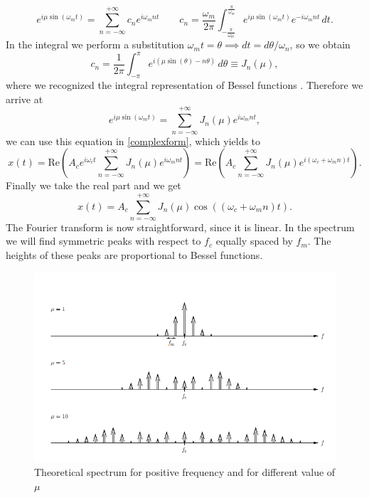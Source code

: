 \documentclass[a4paper,10pt]{article}
\begin{document}
\begin{equation}e^{i\mu \sin(\omega_m t)} = \sum_{n=-\infty}^{+\infty }c_n e^{i\omega_mn t} \qquad c_n=\frac{\omega_m}{2\pi}\int_{-\frac{\pi}{\omega_m}}^{\frac{\pi}{\omega_m}}e^{i\mu \sin(\omega_m t)}e^{-i\omega_mnt}\,dt.\end{equation}
In the integral we perform a substitution $\omega_m t = \theta \implies dt = d\theta/\omega_n$, so we obtain
\begin{equation}c_n=\frac{1}{2\pi}\int_{-\pi}^{\pi}e^{i(\mu \sin(\theta)-n\theta)}\,d\theta \equiv J_n(\mu),\end{equation}
where we recognized the integral representation of Bessel functions \cite{bessel}. Therefore we arrive at
\begin{equation}e^{i\mu \sin(\omega_m t)} = \sum_{n=-\infty}^{+\infty }J_n(\mu) e^{i\omega_mn t},\end{equation}
we can use this equation in \eqref{complexform}, which yields to
\begin{equation}x(t) =  \text{Re}\left(A_c e^{i\omega_c t}\sum_{n=-\infty}^{+\infty }J_n(\mu) e^{i\omega_mn t}\right) =\text{Re}\left(A_c\sum_{n=-\infty}^{+\infty }J_n(\mu) e^{i(\omega_c +\omega_mn )t}\right).\end{equation}
Finally we take the real part and we get
\begin{equation}\label{finalfre}x(t) = A_c \sum_{n=-\infty}^{+\infty }J_n(\mu) \cos((\omega_c +\omega_mn )t).\end{equation}
The Fourier transform is now straightforward, since it is linear. In the spectrum we will find symmetric peaks with respect to $f_c$ equally spaced by $f_m$. The heights of these peaks are proportional to Bessel functions.
\begin{figure}[H]
\centering
\includegraphics[width=.8\textwidth]{freqtheory}
\caption{Theoretical spectrum for positive frequency and for different value of $\mu$}
\end{figure}
\end{document}
